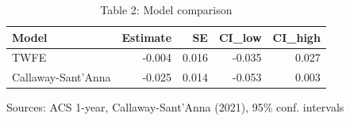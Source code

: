 \begin{table}[t]
\caption*{
{\fontsize{20}{25}\selectfont  Table 2: Model comparison\fontsize{12}{15}\selectfont }
} 
\fontsize{12.0pt}{14.0pt}\selectfont
\begin{tabular*}{\linewidth}{@{\extracolsep{\fill}}lrrrr}
\toprule
Model & Estimate & SE & CI\_low & CI\_high \\ 
\midrule\addlinespace[2.5pt]
TWFE & -0.004 & 0.016 & -0.035 & 0.027 \\ 
Callaway-Sant'Anna & -0.025 & 0.014 & -0.053 & 0.003 \\ 
\bottomrule
\end{tabular*}
\begin{minipage}{\linewidth}
\vspace{.05em}
Sources: ACS 1-year, Callaway-Sant'Anna (2021), 95\% conf. intervals\\
\end{minipage}
\end{table}

